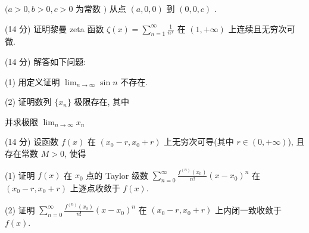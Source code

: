\nopagebreak[4]
$(a>0,b>0,c>0$  为常数 $)$ 从点 $(a,0,0)$  到 $(0,0,c)$ .\par
(14 分) 证明黎曼 zeta 函数 $\zeta(x) = \sum_{n=1}^{\infty} \frac{1}{n^x}$ 在 $(1, +\infty)$ 上连续且无穷次可微.\par
(14 分) 解答如下问题:\par
(1) 用定义证明 $\lim_{n\to \infty}\sin n$ 不存在.\par
\par{}
(2) 证明数列 $\{x_{n}\}$ 极限存在, 其中\par
\nopagebreak[4]
并求极限 $\lim_{n\to \infty}x_n$\par
\par{}
(14 分) 设函数 $f(x)$ 在 $(x_0 - r, x_0 + r)$ 上无穷次可导(其中 $r \in (0, +\infty)$), 且存在常数 $M > 0$, 使得\par
\nopagebreak[4]
(1) 证明 $f(x)$ 在 $x_0$ 点的 Taylor 级数 $\sum_{n=0}^{\infty} \frac{f^{(n)}(x_0)}{n!}(x - x_0)^n$ 在 $(x_0 - r, x_0 + r)$ 上逐点收敛于 $f(x)$.\par
(2) 证明 $\sum_{n=0}^{\infty} \frac{f^{(n)}(x_0)}{n!}(x - x_0)^n$ 在 $(x_0 - r, x_0 + r)$ 上内闭一致收敛于 $f(x)$.\par
\par{}
